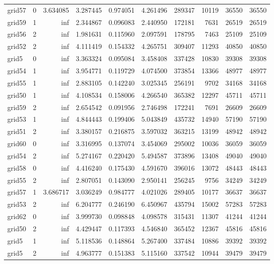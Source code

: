 \begin{longtable}{|l|r|r|r|r|r|r|r|r|r|}
grid57 & 0 & 3.634085 & 3.287445 & 0.974051 & 4.261496 & 289347 & 10119 & 36550 & 36550 \\
grid59 & 1 & inf & 2.344867 & 0.096083 & 2.440950 & 172181 & 7631 & 26519 & 26519 \\
grid56 & 2 & inf & 1.981631 & 0.115960 & 2.097591 & 178795 & 7463 & 25109 & 25109 \\
grid52 & 2 & inf & 4.111419 & 0.154332 & 4.265751 & 309407 & 11293 & 40850 & 40850 \\
grid5 & 0 & inf & 3.363324 & 0.095084 & 3.458408 & 337428 & 10830 & 39308 & 39308 \\
grid54 & 1 & inf & 3.954771 & 0.119729 & 4.074500 & 373854 & 13366 & 48977 & 48977 \\
grid55 & 1 & inf & 2.883105 & 0.142240 & 3.025345 & 256191 & 9702 & 34168 & 34168 \\
grid50 & 1 & inf & 4.108534 & 0.158006 & 4.266540 & 365382 & 12297 & 45711 & 45711 \\
grid59 & 2 & inf & 2.654542 & 0.091956 & 2.746498 & 172241 & 7691 & 26609 & 26609 \\
grid53 & 1 & inf & 4.844443 & 0.199406 & 5.043849 & 435732 & 14940 & 57190 & 57190 \\
grid51 & 2 & inf & 3.380157 & 0.216875 & 3.597032 & 363215 & 13199 & 48942 & 48942 \\
grid60 & 0 & inf & 3.316995 & 0.137074 & 3.454069 & 295002 & 10036 & 36059 & 36059 \\
grid54 & 2 & inf & 5.274167 & 0.220420 & 5.494587 & 373896 & 13408 & 49040 & 49040 \\
grid58 & 0 & inf & 4.416240 & 0.175430 & 4.591670 & 396016 & 13072 & 48443 & 48443 \\
grid55 & 2 & inf & 2.807051 & 0.143090 & 2.950141 & 256245 & 9756 & 34249 & 34249 \\
grid57 & 1 & 3.686717 & 3.036249 & 0.984777 & 4.021026 & 289405 & 10177 & 36637 & 36637 \\
grid53 & 2 & inf & 6.204777 & 0.246190 & 6.450967 & 435794 & 15002 & 57283 & 57283 \\
grid62 & 0 & inf & 3.999730 & 0.098848 & 4.098578 & 315431 & 11307 & 41244 & 41244 \\
grid50 & 2 & inf & 4.429447 & 0.117393 & 4.546840 & 365452 & 12367 & 45816 & 45816 \\
grid5 & 1 & inf & 5.118536 & 0.148864 & 5.267400 & 337484 & 10886 & 39392 & 39392 \\
grid5 & 2 & inf & 4.963777 & 0.151383 & 5.115160 & 337542 & 10944 & 39479 & 39479 \\

\end{longtable}
